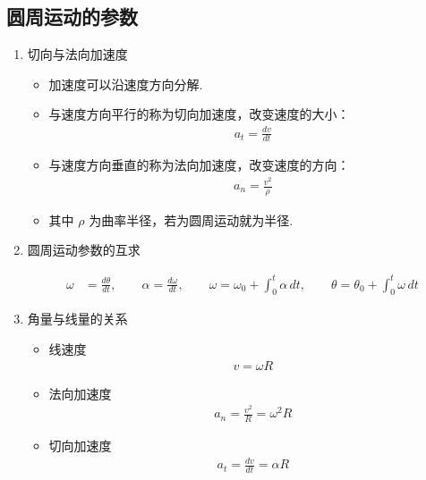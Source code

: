 \newpage
\subsection{圆周运动的参数}

\begin{enumerate}
	
	\item 切向与法向加速度
	
	\begin{itemize}
		\item 加速度可以沿速度方向分解.
		
		\item 与速度方向平行的称为切向加速度，改变速度的大小：
		\begin{align*}
			a_t = \frac{dv}{dt}
		\end{align*}
		
		\item 与速度方向垂直的称为法向加速度，改变速度的方向：
		\begin{align*}
			a_n = \frac{v^2}{\rho}
		\end{align*}
		
		\item 其中 $\rho$ 为曲率半径，若为圆周运动就为半径.
	\end{itemize}
	
	\item 圆周运动参数的互求
	
	\begin{align*}
		\omega &= \frac{d\theta}{dt}, \qquad
		\alpha = \frac{d\omega}{dt}, \qquad
		\omega = \omega_0 + \int_{0}^{t} \alpha \, dt, \qquad
		\theta = \theta_0 + \int_{0}^{t} \omega \, dt
	\end{align*}
	
	\item 角量与线量的关系
	
	\begin{itemize}
		\item 线速度
		\begin{align*}
			v = \omega R
		\end{align*}
		
		\item 法向加速度
		\begin{align*}
			a_n = \frac{v^2}{R} = \omega^2 R
		\end{align*}
		
		\item 切向加速度
		\begin{align*}
			a_t = \frac{dv}{dt} = \alpha R
		\end{align*}
	\end{itemize}
	
	
	
	
\end{enumerate}

